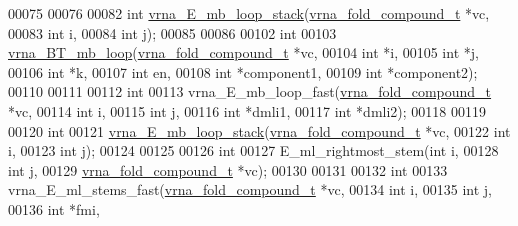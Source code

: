 \begin{DoxyCode}
00075 
00076 
00082 \textcolor{keywordtype}{int} \hyperlink{group__loops_ga73f048d35475e1d8f50b7d4ac6a2aeb6}{vrna\_E\_mb\_loop\_stack}(\hyperlink{group__fold__compound_structvrna__fc__s}{vrna\_fold\_compound\_t} *vc,
00083                          \textcolor{keywordtype}{int}                  i,
00084                          \textcolor{keywordtype}{int}                  j);
00085 
00086 
00102 \textcolor{keywordtype}{int}
00103 \hyperlink{group__loops_ga9cb520ddfd8b3a48089a7910b045d06b}{vrna\_BT\_mb\_loop}(\hyperlink{group__fold__compound_structvrna__fc__s}{vrna\_fold\_compound\_t}  *vc,
00104                 \textcolor{keywordtype}{int}                   *i,
00105                 \textcolor{keywordtype}{int}                   *j,
00106                 \textcolor{keywordtype}{int}                   *k,
00107                 \textcolor{keywordtype}{int}                   en,
00108                 \textcolor{keywordtype}{int}                   *component1,
00109                 \textcolor{keywordtype}{int}                   *component2);
00110 
00111 
00112 \textcolor{keywordtype}{int}
00113 vrna\_E\_mb\_loop\_fast(\hyperlink{group__fold__compound_structvrna__fc__s}{vrna\_fold\_compound\_t}  *vc,
00114                     \textcolor{keywordtype}{int}                   i,
00115                     \textcolor{keywordtype}{int}                   j,
00116                     \textcolor{keywordtype}{int}                   *dmli1,
00117                     \textcolor{keywordtype}{int}                   *dmli2);
00118 
00119 
00120 \textcolor{keywordtype}{int}
00121 \hyperlink{group__loops_ga73f048d35475e1d8f50b7d4ac6a2aeb6}{vrna\_E\_mb\_loop\_stack}(\hyperlink{group__fold__compound_structvrna__fc__s}{vrna\_fold\_compound\_t} *vc,
00122                      \textcolor{keywordtype}{int}                  i,
00123                      \textcolor{keywordtype}{int}                  j);
00124 
00125 
00126 \textcolor{keywordtype}{int}
00127 E\_ml\_rightmost\_stem(\textcolor{keywordtype}{int}                   i,
00128                     \textcolor{keywordtype}{int}                   j,
00129                     \hyperlink{group__fold__compound_structvrna__fc__s}{vrna\_fold\_compound\_t}  *vc);
00130 
00131 
00132 \textcolor{keywordtype}{int}
00133 vrna\_E\_ml\_stems\_fast(\hyperlink{group__fold__compound_structvrna__fc__s}{vrna\_fold\_compound\_t} *vc,
00134                      \textcolor{keywordtype}{int}                  i,
00135                      \textcolor{keywordtype}{int}                  j,
00136                      \textcolor{keywordtype}{int}                  *fmi,

\end{DoxyCode}
